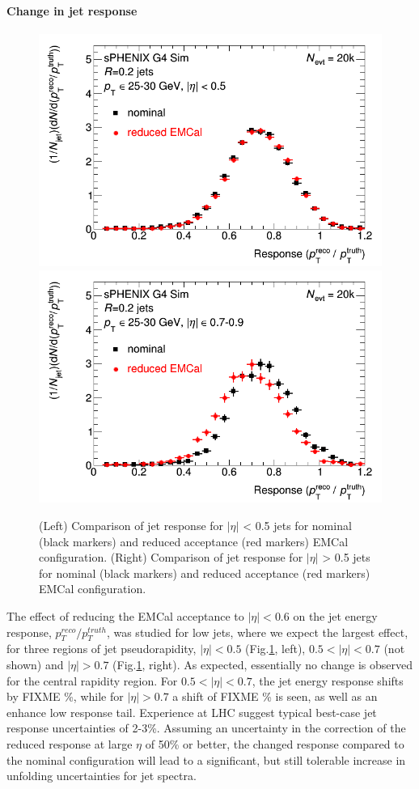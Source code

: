 \paragraph{Change in jet response} 
\begin{figure}[hbt]
  \centering
  \includegraphics[width=0.4\linewidth]{figs/jet_response_reduced_emcal_eta_0} 
  \hspace{0.1\linewidth}
  \includegraphics[width=0.4\linewidth]{figs/jet_response_reduced_emcal_eta_07}
  \caption{(Left) Comparison of jet response for $|\eta|$ < 0.5 jets for nominal (black markers) and reduced acceptance (red markers) EMCal configuration.
  (Right) Comparison of jet response for $|\eta|$ > 0.5 jets for nominal (black markers) and reduced acceptance (red markers) EMCal configuration.}
  \label{fig:jet_response_reduced_emcal}
\end{figure}

The effect of reducing the EMCal acceptance to $|\eta| < 0.6$ on the jet energy response, $p_T^{reco}/p_T^{truth}$, was studied
for low \pt jets, where we expect the largest effect, for three regions of jet pseudorapidity, $|\eta| < 0.5$ (Fig.\ref{fig:jet_response_reduced_emcal}, left), $0.5 < |\eta| < 0.7$ (not shown) and $|\eta| > 0.7$ (Fig.\ref{fig:jet_response_reduced_emcal}, right). As expected, essentially no change
is observed for the central rapidity region. For $0.5 < |\eta| < 0.7$, the jet energy response shifts by FIXME \%, while for $|\eta| > 0.7$ a 
shift of FIXME \% is seen, as well as an enhance low response tail. Experience at LHC suggest typical best-case jet response uncertainties
of 2-3\%. Assuming an uncertainty in the correction of the reduced response at large $\eta$ of 50\% or better, the changed response
compared to the nominal configuration will lead to a significant, but still tolerable increase in unfolding uncertainties for jet spectra.

